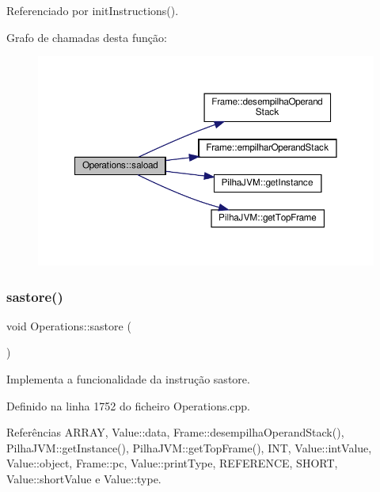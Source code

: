 Referenciado por init\+Instructions().

Grafo de chamadas desta função\+:\nopagebreak
\begin{figure}[H]
\begin{center}
\leavevmode
\includegraphics[width=350pt]{classOperations_ac97743869c458c3ffcda48383308e9b4_cgraph}
\end{center}
\end{figure}
\mbox{\label{classOperations_aab1c34c455478d75c21cdb06d6c94172}} 
\subsubsection{\texorpdfstring{sastore()}{sastore()}}
{\footnotesize\ttfamily void Operations\+::sastore (\begin{DoxyParamCaption}{ }\end{DoxyParamCaption})\hspace{0.3cm}{\ttfamily [private]}}



Implementa a funcionalidade da instrução sastore. 



Definido na linha 1752 do ficheiro Operations.\+cpp.



Referências A\+R\+R\+AY, Value\+::data, Frame\+::desempilha\+Operand\+Stack(), Pilha\+J\+V\+M\+::get\+Instance(), Pilha\+J\+V\+M\+::get\+Top\+Frame(), I\+NT, Value\+::int\+Value, Value\+::object, Frame\+::pc, Value\+::print\+Type, R\+E\+F\+E\+R\+E\+N\+CE, S\+H\+O\+RT, Value\+::short\+Value e Value\+::type.



